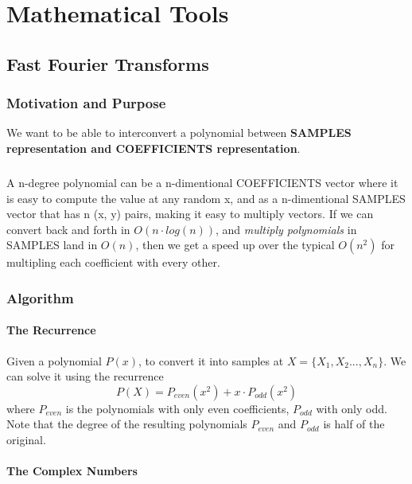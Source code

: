 \chapter{Mathematical Tools}



\section{Fast Fourier Transforms}


\subsection{Motivation and Purpose}

We want to be able to interconvert a polynomial between \textbf{SAMPLES representation and COEFFICIENTS representation}.

\paragraph{} A n-degree polynomial can be a n-dimentional COEFFICIENTS vector where it is easy to compute the value at any random x, and as a n-dimentional SAMPLES vector that has n (x, y) pairs, making it easy to multiply vectors. If we can convert back and forth in $O(n \cdot log(n))$, and \textit{multiply polynomials} in SAMPLES land in $O(n)$, then we get a speed up over the typical $O(n^2)$ for multipling each coefficient with every other.


\subsection{Algorithm}

\subsubsection{The Recurrence}

Given a polynomial $P(x)$, to convert it into samples at $X = \{X_1, X_2 ..., X_n\}$.
We can solve it using the recurrence 
\begin{equation}
  P(X) = P_{even}(x^2) + x \cdot P_{odd}(x^2)
\end{equation}
where $P_{even}$ is the polynomials with only even coefficients, $P_{odd}$ with only odd.
Note that the degree of the resulting polynomials $P_{even}$ and $P_{odd}$ is half of the original.

\subsubsection{The Complex Numbers}

